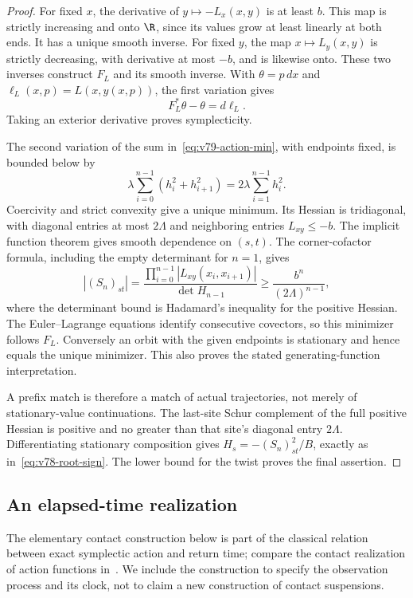 \begin{proof}
For fixed $x$, the derivative of $y\mapsto-L_x(x,y)$ is at least
$b$.  This map is strictly increasing and onto $\R$, since its values
grow at least linearly at both ends.  It has a unique smooth inverse.
For fixed $y$, the map $x\mapsto L_y(x,y)$ is strictly decreasing,
with derivative at most $-b$, and is likewise onto.  These two inverses
construct $F_L$ and its smooth inverse.  With $\theta=p\,dx$ and
$\ell_L(x,p)=L(x,y(x,p))$, the first variation gives
\begin{equation}\label{eq:v79-exact-primitive}
                       F_L^*\theta-\theta=d\ell_L.
\end{equation}
Taking an exterior derivative proves symplecticity.

The second variation of the sum in~\eqref{eq:v79-action-min}, with
endpoints fixed, is bounded below by
\[
 \lambda\sum_{i=0}^{n-1}(h_i^2+h_{i+1}^2)
                    =2\lambda\sum_{i=1}^{n-1}h_i^2.
\]
Coercivity and strict convexity give a unique minimum.  Its Hessian is
tridiagonal, with diagonal entries at most $2\Lambda$ and neighboring
entries $L_{xy}\le-b$.  The implicit function theorem gives smooth
dependence on $(s,t)$.  The corner-cofactor formula, including the
empty determinant for $n=1$, gives
\[
 |(S_n)_{st}|=
     \frac{\prod_{i=0}^{n-1}|L_{xy}(x_i,x_{i+1})|}
                  {\det H_{n-1}}
       \ge \frac{b^n}{(2\Lambda)^{n-1}},
\]
where the determinant bound is Hadamard's inequality for the positive
Hessian.  The Euler--Lagrange equations identify consecutive covectors,
so this minimizer follows $F_L$.  Conversely an orbit with the given
endpoints is stationary and hence equals the unique minimizer.
This also proves the stated generating-function interpretation.

A prefix match is therefore a match of actual trajectories, not merely
of stationary-value continuations.  The last-site Schur complement of
the full positive Hessian is positive and no greater than that site's
diagonal entry $2\Lambda$.  Differentiating stationary composition gives
$H_s=-(S_n)_{st}^2/B$, exactly as in~\eqref{eq:v78-root-sign}.
The lower bound for the twist proves the final assertion.
\end{proof}

\subsection{An elapsed-time realization}

The elementary contact construction below is part of the classical
relation between exact symplectic action and return time; compare the
contact realization of action functions in~\cite{Hutchings2016}.
We include the construction to specify the observation process and its
clock, not to claim a new construction of contact suspensions.

